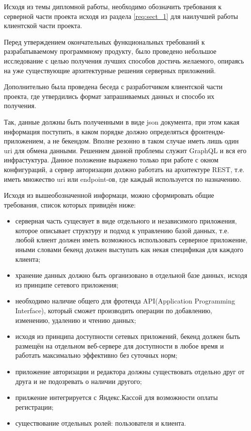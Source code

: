 \label{req:sect_2}

Исходя из темы дипломной работы, необходимо обозначить требования к серверной части проекта исходя из раздела \ref{req:sect_1} для наилучшей работы клиентской части проекта.

Перед утверждением окончательных функциональных требований к разрабатываемому программному продукту, было проведено небольшое исследование с целью получения
лучших способов достичь желаемого, опираясь на уже существующие архитектурные решения серверных приложений.

Дополнительно была проведена беседа с разработчиком клиентской части проекта, где утвердились формат запрашиваемых данных и способо их получения.

Так, данные должны быть полученными в виде json документа, при этом какая информация поступить, в каком порядке должно определяться фронтендм-приложением, а не бекендом.
Вполне резонно в таком случае иметь лишь один uri для обмена данными. Решением данной проблемы служит GraphQL и вся его инфрастуктура. Данное положение выражено только при работе
с окном конфигураций, а сервер авторизации должно работать на архитектуре REST, т.е. иметь множество uri или endpoint-ов, где каждый используется по назначению.

Исходя из вышеобозначенной информаци, можно сформировать общие требования, список которых привидён ниже:
\begin{itemize}
    \item серверная часть сущесвует в виде отдельного и независимого приложения, которое описывает структуру и подход к управлению базой данных, т.е. любой клиент должен иметь возможнось использовать серверное приложение, иными словами бекенд должен выступать как некая спецификая для каждого клиента;
    \item хранение данных должно быть организовано в отдельной базе данных, исходя из принципе сетевого приложения;
    \item необходимо наличие общего для фротенда API(Application Programming Interface), который сможет производить операции по добавлению, изменению, удалению и чтению данных;
    \item исходя из принципа доступности сетевых приложений, бекенд должен быть размещён на отдельном веб-сервере для доступности в любое время и работать максимально эффективно без суточных норм;
    \item приложение авторизации и редактора должны существовать отдельно друг от друга и не подозревать о наличии другого;
    \item прилжение интегрируется с Яндекс.Кассой для возможности оплаты регистрации;
    \item существование отдельных ролей: пользователя и клиента.
\end{itemize}
